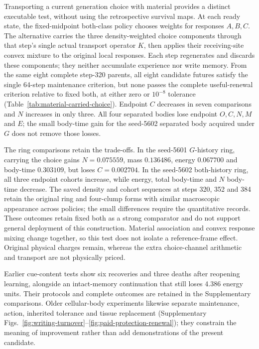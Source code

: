 

Transporting a current generation choice with material provides a distinct executable test, without using the retrospective survival maps. At each ready state, the fixed-midpoint both-class policy chooses weights for responses $A,B,C$. The alternative carries the three density-weighted choice components through that step's single actual transport operator $K$, then applies their receiving-site convex mixture to the original local responses. Each step regenerates and discards these components; they neither accumulate experience nor write memory. From the same eight complete step-320 parents, all eight candidate futures satisfy the single 64-step maintenance criterion, but none passes the complete useful-renewal criterion relative to fixed both, at either zero or $10^{-8}$ tolerance (Table~\ref{tab:material-carried-choice}). Endpoint $C$ decreases in seven comparisons and $N$ increases in only three. All four separated bodies lose endpoint $O,C,N,M$ and $E$; the small body-time gain for the seed-5602 separated body acquired under $G$ does not remove those losses.

The ring comparisons retain the trade-offs. In the seed-5601 $G$-history ring, carrying the choice gains $N=0.075559$, mass $0.136486$, energy $0.067700$ and body-time $0.303109$, but loses $C=0.002704$. In the seed-5602 both-history ring, all three endpoint cohorts increase, while energy, total body-time and $N$ body-time decrease. The saved density and cohort sequences at steps 320, 352 and 384 retain the original ring and four-clump forms with similar macroscopic appearance across policies; the small differences require the quantitative records. These outcomes retain fixed both as a strong comparator and do not support general deployment of this construction. Material association and convex response mixing change together, so this test does not isolate a reference-frame effect. Original physical charges remain, whereas the extra choice-channel arithmetic and transport are not physically priced.



Earlier cue-content tests show six recoveries and three deaths after reopening learning, alongside an intact-memory continuation that still loses 4.386 energy units. Their protocols and complete outcomes are retained in the Supplementary comparisons. Older cellular-body experiments likewise separate maintenance, action, inherited tolerance and tissue replacement (Supplementary Figs.~\ref{fig:writing-turnover}--\ref{fig:paid-protection-renewal}); they constrain the meaning of improvement rather than add demonstrations of the present candidate.
